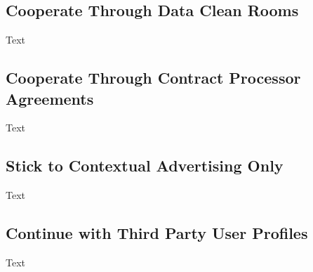 \subsection{Cooperate Through Data Clean Rooms}

Text

\subsection{Cooperate Through Contract Processor Agreements}

Text

\subsection{Stick to Contextual Advertising Only}

Text

\subsection{Continue with Third Party User Profiles}

Text

